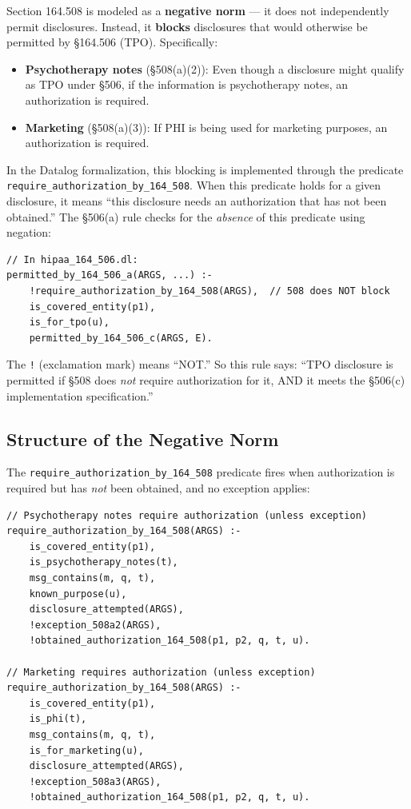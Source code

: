 \documentclass[11pt,letterpaper]{article}
\begin{document}
Section 164.508 is modeled as a \textbf{negative norm} --- it does not independently permit disclosures. Instead, it \textbf{blocks} disclosures that would otherwise be permitted by \S 164.506 (TPO). Specifically:

\begin{itemize}
  \item \textbf{Psychotherapy notes} (\S 508(a)(2)): Even though a disclosure might qualify as TPO under \S 506, if the information is psychotherapy notes, an authorization is required.
  \item \textbf{Marketing} (\S 508(a)(3)): If PHI is being used for marketing purposes, an authorization is required.
\end{itemize}

In the Datalog formalization, this blocking is implemented through the predicate \texttt{require\_authorization\_by\_164\_508}. When this predicate holds for a given disclosure, it means ``this disclosure needs an authorization that has not been obtained.'' The \S 506(a) rule checks for the \emph{absence} of this predicate using negation:

\begin{lstlisting}[style=soufflestyle,caption={How \S 508 blocks \S 506(a) via negation}]
// In hipaa_164_506.dl:
permitted_by_164_506_a(ARGS, ...) :-
    !require_authorization_by_164_508(ARGS),  // 508 does NOT block
    is_covered_entity(p1),
    is_for_tpo(u),
    permitted_by_164_506_c(ARGS, E).
\end{lstlisting}

The \texttt{!} (exclamation mark) means ``NOT.'' So this rule says: ``TPO disclosure is permitted if \S 508 does \emph{not} require authorization for it, AND it meets the \S 506(c) implementation specification.''

\subsection{Structure of the Negative Norm}

The \texttt{require\_authorization\_by\_164\_508} predicate fires when authorization is required but has \emph{not} been obtained, and no exception applies:

\begin{lstlisting}[style=soufflestyle,caption={The negative norm --- require\_authorization (from hipaa\_164\_508.dl)}]
// Psychotherapy notes require authorization (unless exception)
require_authorization_by_164_508(ARGS) :-
    is_covered_entity(p1),
    is_psychotherapy_notes(t),
    msg_contains(m, q, t),
    known_purpose(u),
    disclosure_attempted(ARGS),
    !exception_508a2(ARGS),
    !obtained_authorization_164_508(p1, p2, q, t, u).

// Marketing requires authorization (unless exception)
require_authorization_by_164_508(ARGS) :-
    is_covered_entity(p1),
    is_phi(t),
    msg_contains(m, q, t),
    is_for_marketing(u),
    disclosure_attempted(ARGS),
    !exception_508a3(ARGS),
    !obtained_authorization_164_508(p1, p2, q, t, u).
\end{lstlisting}
\end{document}
